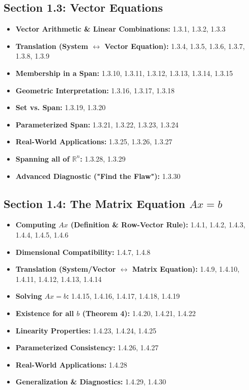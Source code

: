 \documentclass[12pt]{article}
\begin{document}
\subsection{Section 1.3: Vector Equations}
\begin{itemize}
    \item \textbf{Vector Arithmetic \& Linear Combinations:} 1.3.1, 1.3.2, 1.3.3
    \item \textbf{Translation (System $\leftrightarrow$ Vector Equation):} 1.3.4, 1.3.5, 1.3.6, 1.3.7, 1.3.8, 1.3.9
    \item \textbf{Membership in a Span:} 1.3.10, 1.3.11, 1.3.12, 1.3.13, 1.3.14, 1.3.15
    \item \textbf{Geometric Interpretation:} 1.3.16, 1.3.17, 1.3.18
    \item \textbf{Set vs. Span:} 1.3.19, 1.3.20
    \item \textbf{Parameterized Span:} 1.3.21, 1.3.22, 1.3.23, 1.3.24
    \item \textbf{Real-World Applications:} 1.3.25, 1.3.26, 1.3.27
    \item \textbf{Spanning all of $\mathbb{R}^n$:} 1.3.28, 1.3.29
    \item \textbf{Advanced Diagnostic ("Find the Flaw"):} 1.3.30
\end{itemize}

\subsection{Section 1.4: The Matrix Equation $Ax=b$}
\begin{itemize}
    \item \textbf{Computing $Ax$ (Definition \& Row-Vector Rule):} 1.4.1, 1.4.2, 1.4.3, 1.4.4, 1.4.5, 1.4.6
    \item \textbf{Dimensional Compatibility:} 1.4.7, 1.4.8
    \item \textbf{Translation (System/Vector $\leftrightarrow$ Matrix Equation):} 1.4.9, 1.4.10, 1.4.11, 1.4.12, 1.4.13, 1.4.14
    \item \textbf{Solving $Ax=b$:} 1.4.15, 1.4.16, 1.4.17, 1.4.18, 1.4.19
    \item \textbf{Existence for all $b$ (Theorem 4):} 1.4.20, 1.4.21, 1.4.22
    \item \textbf{Linearity Properties:} 1.4.23, 1.4.24, 1.4.25
    \item \textbf{Parameterized Consistency:} 1.4.26, 1.4.27
    \item \textbf{Real-World Applications:} 1.4.28
    \item \textbf{Generalization \& Diagnostics:} 1.4.29, 1.4.30
\end{itemize}
\end{document}
